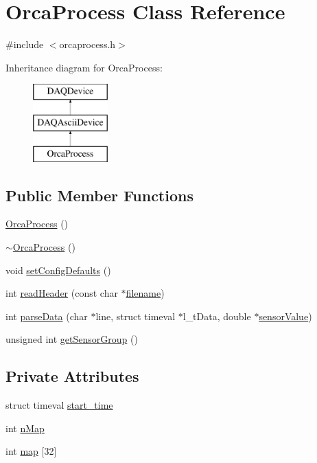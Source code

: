 \hypertarget{classOrcaProcess}{\section{Orca\-Process Class Reference}
\label{classOrcaProcess}
}


{\ttfamily \#include $<$orcaprocess.\-h$>$}

Inheritance diagram for Orca\-Process\-:\begin{figure}[H]
\begin{center}
\leavevmode
\includegraphics[height=3.000000cm]{classOrcaProcess}
\end{center}
\end{figure}
\subsection*{Public Member Functions}
\begin{DoxyCompactItemize}
\item 
\hyperlink{classOrcaProcess_add7cf4d095b94f701662b4fc051d1600}{Orca\-Process} ()
\item 
\hyperlink{classOrcaProcess_aca7bc651902e89fcb147745eeb57c671}{$\sim$\-Orca\-Process} ()
\item 
void \hyperlink{classOrcaProcess_a987ff32d0ec211530e76e108bd5e0460}{set\-Config\-Defaults} ()
\item 
int \hyperlink{classOrcaProcess_af433a05b744459be6427500d237c23c8}{read\-Header} (const char $\ast$\hyperlink{classDAQDevice_a7f9cda7cf5b41f6b134c313477e9644b}{filename})
\item 
int \hyperlink{classOrcaProcess_a3bfc4800f22f99f2370cd513a4a19c7c}{parse\-Data} (char $\ast$line, struct timeval $\ast$l\-\_\-t\-Data, double $\ast$\hyperlink{classDAQDevice_ad148188c57598fdf4fd4c1c333aeb0d8}{sensor\-Value})
\item 
unsigned int \hyperlink{classOrcaProcess_ab22bbbebedbbedeb83965377fb2b302b}{get\-Sensor\-Group} ()
\end{DoxyCompactItemize}
\subsection*{Private Attributes}
\begin{DoxyCompactItemize}
\item 
struct timeval \hyperlink{classOrcaProcess_a1102459cdbab05a4bb25475c12acbc12}{start\-\_\-time}
\item 
int \hyperlink{classOrcaProcess_a2d931dc79514b21a612a531bfb4190fa}{n\-Map}
\item 
int \hyperlink{classOrcaProcess_aac55db93ffac32ffa0b5bf1cf0975ac6}{map} \mbox{[}32\mbox{]}
\end{DoxyCompactItemize}

